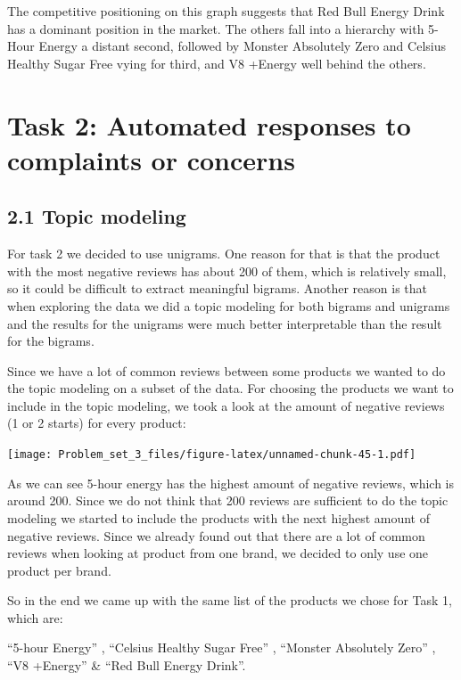 \documentclass[
]{article}
\begin{document}
The competitive positioning on this graph suggests that Red Bull Energy
Drink has a dominant position in the market. The others fall into a
hierarchy with 5-Hour Energy a distant second, followed by Monster
Absolutely Zero and Celsius Healthy Sugar Free vying for third, and V8
+Energy well behind the others.

\hypertarget{task-2-automated-responses-to-complaints-or-concerns}{%
\section{Task 2: Automated responses to complaints or
concerns}\label{task-2-automated-responses-to-complaints-or-concerns}}

\hypertarget{topic-modeling}{%
\subsection{2.1 Topic modeling}\label{topic-modeling}}

For task 2 we decided to use unigrams. One reason for that is that the
product with the most negative reviews has about 200 of them, which is
relatively small, so it could be difficult to extract meaningful
bigrams. Another reason is that when exploring the data we did a topic
modeling for both bigrams and unigrams and the results for the unigrams
were much better interpretable than the result for the bigrams.

Since we have a lot of common reviews between some products we wanted to
do the topic modeling on a subset of the data. For choosing the products
we want to include in the topic modeling, we took a look at the amount
of negative reviews (1 or 2 starts) for every product:

\texttt{[image: Problem\_set\_3\_files/figure-latex/unnamed-chunk-45-1.pdf]}

As we can see 5-hour energy has the highest amount of negative reviews,
which is around 200. Since we do not think that 200 reviews are
sufficient to do the topic modeling we started to include the products
with the next highest amount of negative reviews. Since we already found
out that there are a lot of common reviews when looking at product from
one brand, we decided to only use one product per brand.

So in the end we came up with the same list of the products we chose for
Task 1, which are:

``5-hour Energy'' , ``Celsius Healthy Sugar Free'' , ``Monster
Absolutely Zero'' , ``V8 +Energy'' \& ``Red Bull Energy Drink''.
\end{document}
